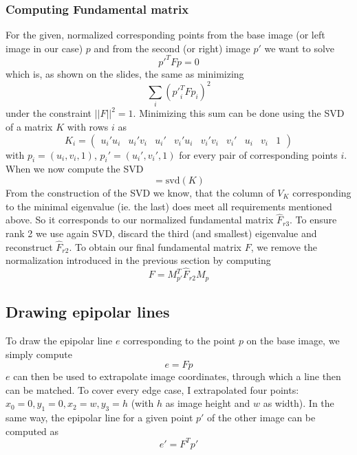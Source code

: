 \documentclass{paper}
\begin{document}
\subsubsection{Computing Fundamental matrix}
For the given, normalized corresponding points from the base image (or left image in our case) $p$ and from the second (or right) image $p'$ 
we want to solve 
\begin{equation}
	p'^T F p = 0
\end{equation}
which is, as shown on the slides, the same as minimizing
\begin{equation}
	\sum_i ({p'}_i^T F p_i)^2
\end{equation}
under the constraint $||F||^2 = 1$. Minimizing this sum can be done using the SVD of a matrix $K$ with rows $i$ as
\begin{equation}
K_i = 
\begin{pmatrix}
 u_i'u_i & u_i'v_i & u_i' & v_i'u_i & v_i'v_i & v_i' & u_i & v_i & 1 
\end{pmatrix}
\end{equation}
with $p_i = (u_i,v_i,1)$, $p_i' = (u_i',v_i',1)$ for every pair of corresponding points $i$. When we now compute the SVD
\begin{equation}
	[U_K, D_K, V_K] = \text{svd}(K)
\end{equation}
From the construction of the SVD we know, that the column of $V_K$ corresponding to the minimal eigenvalue (ie. the last) does meet all
requirements mentioned above. So it corresponds to our normalized
fundamental matrix $\hat{F}_{r3}$. To ensure rank 2 we use again SVD, 
discard the third (and smallest) eigenvalue and reconstruct $\hat{F}_{r2}$. 
To obtain our final fundamental matrix $F$, we remove the normalization introduced in the previous section by computing 
   \begin{equation}
   F = M_{p'}^ T \hat{F}_{r2} M_p
   \end{equation}
   
\subsection{Drawing epipolar lines}
To draw the epipolar line $e$ corresponding to the point $p$ on the base image, we simply compute
\begin{equation}
	e = F p
\end{equation}
$e$ can then be used to extrapolate image coordinates, through which a line then can be matched. 
To cover every edge case, I extrapolated four points: $x_0 = 0, y_1 = 0, x_2 = w, y_3 = h$ (with $h$ as image height and $w$ as width). 
In the same way, the epipolar line for a given point $p'$ of the other image can be computed as
\begin{equation}
	e' = F^Tp'
\end{equation} 
\end{document}
